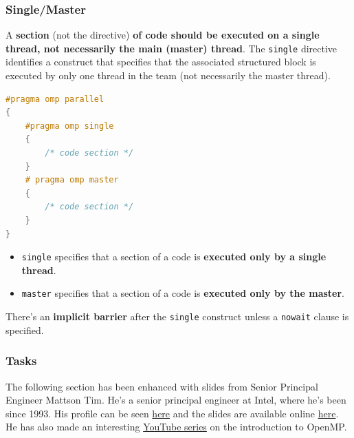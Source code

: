 \newpage

\subsubsection{Single/Master}

A \textbf{section} (not the directive) \textbf{of code should be executed on a single thread, not necessarily the main (master) thread}. The \texttt{single} directive identifies a construct that specifies that the associated structured block is executed by only one thread in the team (not necessarily the master thread).

\begin{openmpbox}
\begin{lstlisting}[language=C++]
#pragma omp parallel
{
    #pragma omp single
    {
        /* code section */
    }
    # pragma omp master
    {
        /* code section */
    }
}\end{lstlisting}
\end{openmpbox}

\begin{itemize}
    \item \texttt{single} specifies that a section of a code is \textbf{executed only by a single thread}.

    
    \item \texttt{master} specifies that a section of a code is \textbf{executed only by the master}.
\end{itemize}

\noindent
There's an \textbf{implicit barrier} after the \texttt{single} construct unless a \texttt{nowait} clause is specified.

\newpage

\subsubsection{Tasks}

The following section has been enhanced with slides from Senior Principal Engineer Mattson Tim. He's a senior principal engineer at Intel, where he's been since 1993. His profile can be seen \href{https://www.intel.com/content/www/us/en/research/featured-researchers/tim-mattson.html}{here} and the slides are available online \href{https://www.openmp.org/wp-content/uploads/Intro_To_OpenMP_Mattson.pdf}{here}. He has also made an interesting \href{https://youtube.com/playlist?list=PLLX-Q6B8xqZ8n8bwjGdzBJ25X2utwnoEG&si=OBjyY4AI4zWfA-vB}{YouTube series} on the introduction to OpenMP.

